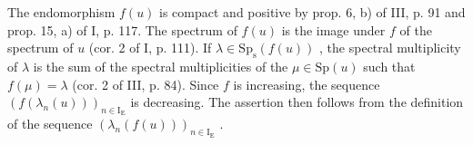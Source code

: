 The endomorphism \(f(u)\) is compact and positive by prop. 6, b) of III, p. 91 and prop. 15, a) of I, p. 117. The spectrum of \(f(u)\) is the image under \(f\) of the spectrum of \(u\) (cor. 2 of I, p. 111). If \(\lambda \in \mathrm{Sp}_{\mathrm{s}}(f(u))\) , the spectral multiplicity of \(\lambda\) is the sum of the spectral multiplicities of the \(\mu \in \mathrm{Sp}(u)\) such that \(f(\mu) = \lambda\) (cor. 2 of III, p. 84). Since \(f\) is increasing, the sequence \((f(\lambda_n(u)))_{n \in \mathrm{I_E}}\) is decreasing. The assertion then follows from the definition of the sequence \((\lambda_n(f(u)))_{n \in \mathrm{I_E}}\) .

